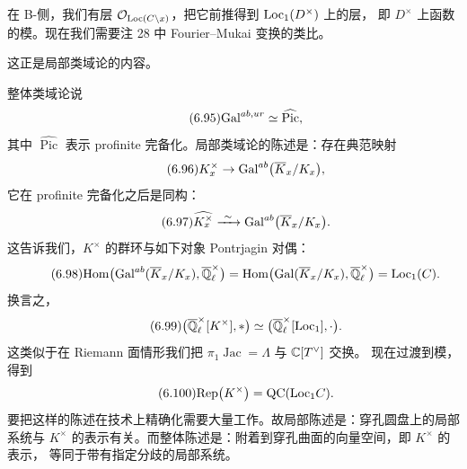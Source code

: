 在 B-侧，我们有层 $\mathcal{O}_{\mathrm{Loc}(C\setminus x)}$，把它前推得到 $\mathrm{Loc}_1(D^{\times})$ 上的层，
即 $D^{\times}$ 上函数的模。现在我们需要注 28 中 Fourier--Mukai 变换的类比。

这正是局部类域论的内容。

整体类域论说
\begin{equation}\tag{6.95}\label{eq:6.95}
\mathrm{Gal}^{ab,ur}\simeq\widehat{\operatorname{Pic}},
\end{equation}
其中 $\widehat{\operatorname{Pic}}$ 表示 profinite 完备化。局部类域论的陈述是：存在典范映射
\begin{equation}\tag{6.96}\label{eq:6.96}
K_x^{\times}\to\mathrm{Gal}^{ab}\bigl(\overline{K}_x/K_x\bigr),
\end{equation}
它在 profinite 完备化之后是同构：
\begin{equation}\tag{6.97}\label{eq:6.97}
\widehat{K_x^{\times}}\xrightarrow{\ \sim\ }\Gal^{ab}\bigl(\overline{K}_x/K_x\bigr).
\end{equation}
这告诉我们，$K^{\times}$ 的群环与如下对象 Pontrjagin 对偶：
\begin{equation}\tag{6.98}\label{eq:6.98}
\mathrm{Hom}\bigl(\mathrm{Gal}^{ab}(\overline{K}_x/K_x),\overline{\mathbb{Q}}_{\ell}^{\times}\bigr)
=\mathrm{Hom}\bigl(\mathrm{Gal}(\overline{K}_x/K_x),\overline{\mathbb{Q}}_{\ell}^{\times}\bigr)
=\mathrm{Loc}_1(C).
\end{equation}
换言之，
\begin{equation}\tag{6.99}\label{eq:6.99}
\bigl(\overline{\mathbb{Q}}_{\ell}^{\times}[K^{\times}],*\bigr)
\simeq\bigl(\overline{\mathbb{Q}}_{\ell}^{\times}[\mathrm{Loc}_1],\cdot\bigr).
\end{equation}
这类似于在 Riemann 面情形我们把 $\pi_1\operatorname{Jac}=\Lambda$ 与 $\mathbb{C}[T^{\vee}]$ 交换。
现在过渡到模，得到
\begin{equation}\tag{6.100}\label{eq:6.100}
\mathrm{Rep}\bigl(K^{\times}\bigr)=\mathrm{QC}(\mathrm{Loc}_1 C).
\end{equation}
要把这样的陈述在技术上精确化需要大量工作。故局部陈述是：穿孔圆盘上的局部系统与
$K^{\times}$ 的表示有关。而整体陈述是：附着到穿孔曲面的向量空间，即 $K^{\times}$ 的表示，
等同于带有指定分歧的局部系统。


